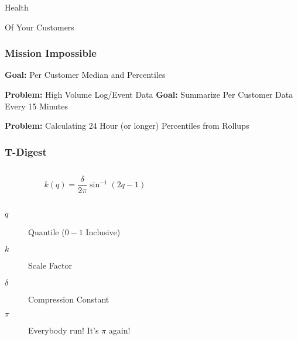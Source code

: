 

\begin{frame}[standout]
    Health

    {\small Of Your Customers}
\end{frame}


\begin{frame}
    \frametitle{Mission Impossible}

    \textbf{Goal:} Per Customer Median and Percentiles

    \textbf{Problem:} High Volume Log/Event Data
    \vskip 1cm
    \textbf{Goal:} Summarize Per Customer Data Every 15 Minutes

    \textbf{Problem:} Calculating 24 Hour (or longer) Percentiles from Rollups
\end{frame}

\begin{frame}
    \frametitle{T-Digest}

    \begin{columns}
        \begin{column}{0.4\textwidth}

            $$ k(q) = \frac{\delta}{2\pi} \sin^{-1}(2q-1) $$
            ~
            \begin{description}
                \item[$q$] Quantile ($0 - 1$ Inclusive)
                \item[$k$]  Scale Factor
                \item[$\delta$] Compression Constant
                \item[$\pi$] Everybody run!  It's $\pi$ again!
            \end{description}
        \end{column}
        \begin{column}{0.6\textwidth}
            \begin{figure}[!h]
                \centering
                \resizebox{\columnwidth}{!}{}
            \end{figure}
        \end{column}
    \end{columns}
\end{frame}


